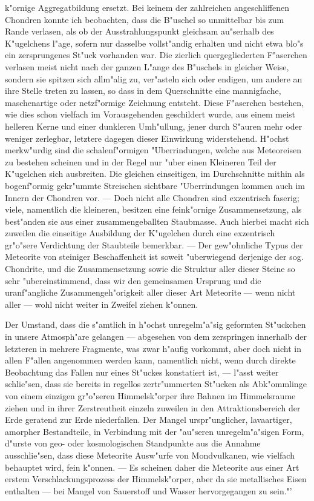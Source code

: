 \documentclass[a4paper, 11pt, oneside]{article}
\begin{document}
k"ornige Aggregatbildung ersetzt. Bei keinem der zahlreichen angeschliffenen Chondren konnte ich beobachten, dass die B"uschel so unmittelbar bis zum Rande verlasen, als ob der Ausstrahlungspunkt gleichsam au"serhalb des K"ugelchens l"age, sofern nur dasselbe vollst"andig erhalten und nicht etwa blo"s ein zersprungenes St"uck vorhanden war. Die zierlich quergegliederten F"aserchen verlasen meist nicht nach der ganzen L"ange des B"uschels in gleicher Weise, sondern sie spitzen sich allm"alig zu, ver"asteln sich oder endigen, um andere an ihre Stelle treten zu lassen, so dass in dem Querschnitte eine mannigfache, maschenartige oder netzf"ormige Zeichnung entsteht. Diese F"aserchen bestehen, wie dies schon vielfach im Vorausgehenden geschildert wurde, aus einem meist helleren Kerne und einer dunkleren Umh"ullung, jener durch S"auren mehr oder weniger zerlegbar, letztere dagegen dieser Einwirkung widerstehend. H"ochst merkw"urdig sind die schalenf"ormigen "Uberrindungen, welche aus Meteoreisen zu bestehen scheinen und in der Regel nur "uber einen Kleineren Teil der K"ugelchen sich ausbreiten. Die gleichen einseitigen, im Durchschnitte mithin als bogenf"ormig gekr"ummte Streischen sichtbare "Uberrindungen kommen auch im Innern der Chondren vor. --- Doch nicht alle Chondren sind exzentrisch faserig; viele, namentlich die kleineren, besitzen eine feink"ornige Zusammensetzung, als best"anden sie aus einer zusammengeballten Staubmasse. Auch hierbei macht sich zuweilen die einseitige Ausbildung der K"ugelchen durch eine exzentrisch gr"o"sere Verdichtung der Staubteile bemerkbar. --- Der gew"ohnliche Typus der Meteorite von steiniger Beschaffenheit ist soweit "uberwiegend derjenige der sog. Chondrite, und die Zusammensetzung sowie die Struktur aller dieser Steine so sehr "ubereinstimmend, dass wir den gemeinsamen Ursprung und die uranf"angliche Zusammengeh"origkeit aller dieser Art Meteorite --- wenn nicht aller --- wohl nicht weiter in Zweifel ziehen k"onnen.

Der Umstand, dass die s"amtlich in h"ochst unregelm"a"sig geformten St"uckchen in unsere Atmosph"are gelangen --- abgesehen von dem zerspringen innerhalb der letzteren in mehrere Fragmente, was zwar h"aufig vorkommt, aber doch nicht in allen F"allen angenommen werden kann, namentlich nicht, wenn durch direkte Beobachtung das Fallen nur eines St"uckes konstatiert ist, --- l"asst weiter schlie"sen, dass sie bereits in regellos zertr"ummerten St"ucken als Abk"ommlinge von einem einzigen gr"o"seren Himmelsk"orper ihre Bahnen im Himmelsraume ziehen und in ihrer Zerstreutheit einzeln zuweilen in den Attraktionsbereich der Erde geratend zur Erde niederfallen. Der Mangel urspr"unglicher, lavaartiger, amorpher Bestandteile, in Verbindung mit der "au"seren unregelm"a"sigen Form, d"urste von geo- oder kosmologischen Standpunkte aus die Annahme ausschlie"sen, dass diese Meteorite Ausw"urfe von Mondvulkanen, wie vielfach behauptet wird, fein k"onnen. --- Es scheinen daher die Meteorite aus einer Art erstem Verschlackungsprozess der Himmelsk"orper, aber da sie metallisches Eisen enthalten --- bei Mangel von Sauerstoff und Wasser hervorgegangen zu sein."'
\end{document}
